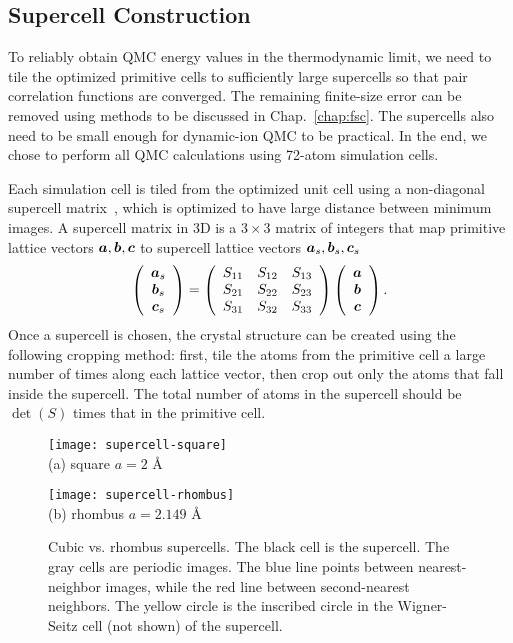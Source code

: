 \subsection{Supercell Construction}
To reliably obtain QMC energy values in the thermodynamic limit, we need to tile the optimized primitive cells to sufficiently large supercells so that pair correlation functions are converged.
The remaining finite-size error can be removed using methods to be discussed in Chap.~\ref{chap:fsc}.
The supercells also need to be small enough for dynamic-ion QMC to be practical.
In the end, we chose to perform all QMC calculations using 72-atom simulation cells.

Each simulation cell is tiled from the optimized unit cell using a non-diagonal supercell matrix~\cite{Lloyd-Williams2015}, which is optimized to have large distance between minimum images.
A supercell matrix in 3D is a $3\times 3$ matrix of integers that map primitive lattice vectors $\boldsymbol{a}, \boldsymbol{b}, \boldsymbol{c}$ to supercell lattice vectors  $\boldsymbol{a}_s, \boldsymbol{b}_s, \boldsymbol{c}_s$
\begin{align}
\left(\begin{array}{c}
\boldsymbol{a}_s \\
\boldsymbol{b}_s \\
\boldsymbol{c}_s
\end{array}\right) =
\left(\begin{array}{ccc}
S_{11} & S_{12} & S_{13} \\
S_{21} & S_{22} & S_{23} \\
S_{31} & S_{32} & S_{33}
\end{array}\right)
\left(\begin{array}{c}
\boldsymbol{a} \\
\boldsymbol{b} \\
\boldsymbol{c}
\end{array}\right).
\end{align}
Once a supercell is chosen, the crystal structure can be created using the following cropping method: first, tile the atoms from the primitive cell a large number of times along each lattice vector, then crop out only the atoms that fall inside the supercell.
The total number of atoms in the supercell should be $\det(S)$ times that in the primitive cell.

\begin{figure}[h]
\centering
\begin{minipage}{0.49\textwidth}
\centering
\texttt{[image: supercell-square]}\\
(a) square $a=2$ \AA
\end{minipage}
\begin{minipage}{0.49\textwidth}
\centering
\texttt{[image: supercell-rhombus]}\\
(b) rhombus $a=2.149$ \AA
\end{minipage}
\caption{Cubic vs. rhombus supercells. The black cell is the supercell. The gray cells are periodic images. The blue line points between nearest-neighbor images, while the red line between second-nearest neighbors. The yellow circle is the inscribed circle in the Wigner-Seitz cell (not shown) of the supercell.}
\label{fig:hsolid-square-vs-rhombus}
\end{figure}


